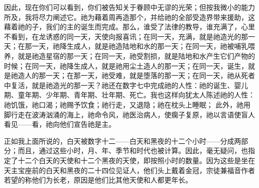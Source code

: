 因此，现在你们可以看到，你们被告知关于眷顾中无谬的光荣；但按我微小的能力所及，我将尽力阐述它。祂为藉着周再造那个，并给祂的全部受造界带来援助，这藉着祂的子，我们的主的诞生而完成。那么，谁受了法律的教导，谁充满了，心里不看到，在龙诱惑的同一天，天使向报喜讯；在同一天，充满，就是祂造光的那一天；在那一天，祂降生成人，就是祂造陆地和水的那一天；在同一天，祂被哺乳喂养，就是祂造星宿的那一天；在同一天，祂受割损，就是陆地和水产生它们产物的时候；在同一天，祂降生成人，就是祂用尘土造人的那一天；在同一天，诞生，就是祂造人的那一天；在那一天，祂受难，就是堕落的那一天；在同一天，祂从死者中复活，就是祂造光的那一天？祂还在数字七中完成祂的人性：祂的诞生、婴儿期、童年期、少年期、青年期、壮年期、死亡。我也这样向犹太人陈述祂的人性：祂饥饿，祂口渴；祂赐予饮食；祂行走，又退隐；祂在枕头上睡眠； 此外，祂用脚行走在波涛汹涌的海上，祂命令风，祂医治病人，使瘸子复原，祂以言语使盲人看见——看，祂向他们宣告祂是主。\par

正如我上面所说的，白天被数字十二——白天和黑夜的十二个小时——分成两部分；而且，通过这些小时，月、年、季节和时代也被计算。因此，毫无疑问，也指定了十二个白天的天使和十二个黑夜的天使，即按照小时的数量。因为这些是坐在天主宝座前的白天和黑夜的二十四位见证人，他们头上戴着金冠，宗徒兼福音作者若望的称他们为长老，原因是他们比其他天使和人都更年长。\par

